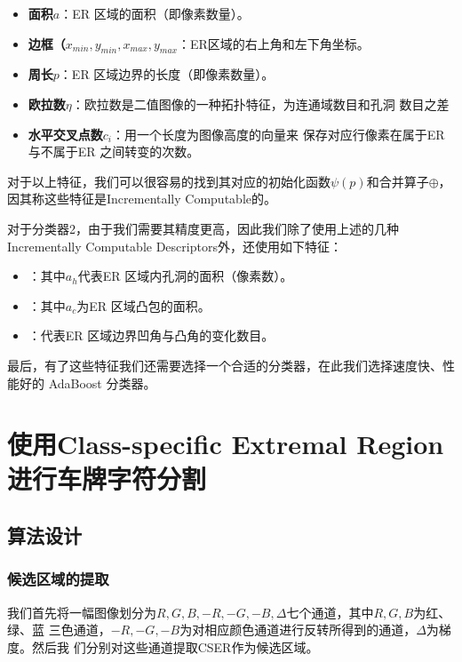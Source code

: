 \begin{itemize}
\item \textbf{面积$a$}：ER 区域的面积（即像素数量）。
\item \textbf{边框（$x_{min}, y_{min}, x_{max}, y_{max}$}：ER区域的右上角和左下角坐标。
\item \textbf{周长$p$}：ER 区域边界的长度（即像素数量）。
\item \textbf{欧拉数$\eta$}：欧拉数是二值图像的一种拓扑特征，为连通域数目和孔洞
  数目之差
\item \textbf{水平交叉点数$c_i$}：用一个长度为图像高度的向量来
保存对应行像素在属于ER与不属于ER 之间转变的次数。
\end{itemize}

对于以上特征，我们可以很容易的找到其对应的初始化函数$\psi(p)$和合并算子$\oplus$，
因其称这些特征是Incrementally Computable的。

对于分类器2，由于我们需要其精度更高，因此我们除了使用上述的几种Incrementally
Computable Descriptors外，还使用如下特征：

\begin{itemize}
\item {}：其中$a_h$代表ER 区域内孔洞的面积（像素数）。
\item {}：其中$a_c$为ER 区域凸包的面积。
\item {}：代表ER 区域边界凹角与凸角的变化数目。
\end{itemize}

最后，有了这些特征我们还需要选择一个合适的分类器，在此我们选择速度快、性能好的
AdaBoost 分类器。

\section{使用Class-specific Extremal Region进行车牌字符分割}

\subsection{算法设计}

\subsubsection{候选区域的提取}

我们首先将一幅图像划分为$R,G,B,-R,-G,-B,\Delta$七个通道，其中$R,G,B$为红、绿、蓝
三色通道，$-R,-G,-B$为对相应颜色通道进行反转所得到的通道，$\Delta$为梯度。然后我
们分别对这些通道提取CSER作为候选区域。

